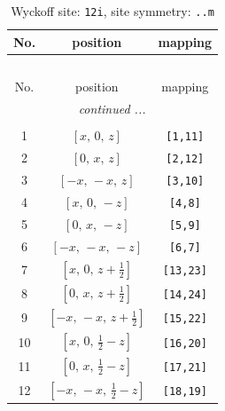 \documentclass[fleqn,8pt]{jsarticle}
\begin{document}
\begin{longtable}{ccc}
\caption{Wyckoff site: {\tt 12i}, site symmetry: {\tt ..m}}
 \\
 \hline \hline
No. & position & mapping \\ \hline \endfirsthead

\multicolumn{2}{l}{\tablename\ \thetable{}} \\
 \hline \hline
No. & position & mapping \\ \hline \endhead

 \hline \hline
\multicolumn{2}{r}{\footnotesize\it continued ...} \\ \endfoot

 \hline \hline
\multicolumn{2}{r}{} \\ \endlastfoot

1 & $\left[ x,\, 0,\, z \right]$ & {\tt [1,11]} \\ \hline
2 & $\left[ 0,\, x,\, z \right]$ & {\tt [2,12]} \\ \hline
3 & $\left[ - x,\, - x,\, z \right]$ & {\tt [3,10]} \\ \hline
4 & $\left[ x,\, 0,\, - z \right]$ & {\tt [4,8]} \\ \hline
5 & $\left[ 0,\, x,\, - z \right]$ & {\tt [5,9]} \\ \hline
6 & $\left[ - x,\, - x,\, - z \right]$ & {\tt [6,7]} \\ \hline
7 & $\left[ x,\, 0,\, z + \frac{1}{2} \right]$ & {\tt [13,23]} \\ \hline
8 & $\left[ 0,\, x,\, z + \frac{1}{2} \right]$ & {\tt [14,24]} \\ \hline
9 & $\left[ - x,\, - x,\, z + \frac{1}{2} \right]$ & {\tt [15,22]} \\ \hline
10 & $\left[ x,\, 0,\, \frac{1}{2} - z \right]$ & {\tt [16,20]} \\ \hline
11 & $\left[ 0,\, x,\, \frac{1}{2} - z \right]$ & {\tt [17,21]} \\ \hline
12 & $\left[ - x,\, - x,\, \frac{1}{2} - z \right]$ & {\tt [18,19]} \\
\end{longtable}
\renewcommand{\arraystretch}{1.2}
\end{document}
